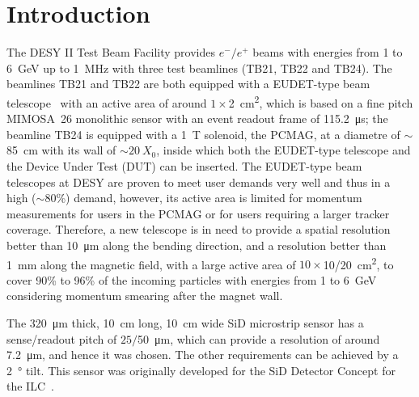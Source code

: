 \documentclass[journal]{IEEEtran}
\begin{document}
%



\section{Introduction}
The DESY II Test Beam Facility\cite{desytbf}
provides $e^-/e^+$ beams with energies from 1 to \SI{6}{\GeV} up to \SI{1}{\MHz}
with three test beamlines (TB21, TB22 and TB24).
The beamlines TB21 and TB22 are both equipped with a EUDET-type beam telescope~\cite{eudet}
with an active area of around $1\times$\SI{2}{\square\centi\metre},
which is based on a fine pitch \uppercase{mimosa}~26 monolithic sensor with an event readout frame of \SI{115.2}{\micro\second};
the beamline TB24 is equipped with a \SI{1}{\tesla} solenoid, the PCMAG, at a diametre of $\sim$\SI{85}{\centi\metre} with its wall of $\sim$$\SI{20}{X_0}$,
inside which both the EUDET-type telescope and the Device Under Test (DUT) can be inserted.
The EUDET-type beam telescopes at DESY are proven to meet user demands very well and thus in a high ($\sim$80\%) demand,
however, its active area is limited for momentum measurements for users in the PCMAG or for users requiring a larger tracker coverage.
Therefore, a new telescope is in need to provide a spatial resolution better than \SI{10}{\micro\metre} along the bending direction,
and a resolution better than \SI{1}{\milli\metre} along the magnetic field,
with a large active area of $10\times$10/\SI{20}{\square\centi\metre},
to cover 90\% to 96\% of the incoming particles with energies from 1 to \SI{6}{\GeV} considering momentum smearing after the magnet wall.

The \SI{320}{\micro\metre} thick, \SI{10}{cm} long, \SI{10}{cm} wide SiD microstrip sensor has a sense/readout pitch of $25/$\SI{50}{\micro\metre},
which can provide a resolution of around \SI{7.2}{\micro\metre}, and hence it was chosen.
The other requirements can be achieved by a \SI{2}{\degree} tilt.
This sensor was originally developed for the SiD Detector Concept for the ILC~\cite{Behnke:2013lya}.
\end{document}

